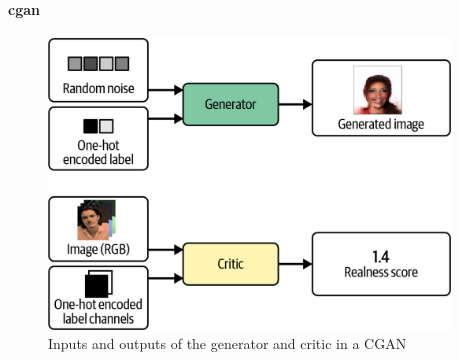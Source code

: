 \paragraph{\gls{cgan}}

\begin{figure}
	\begin{center}
		\includegraphics[width=0.95\textwidth]{figures/cgan}
	\end{center}
	\caption{Inputs and outputs of the generator and critic in a CGAN}\label{fig:cgan}
\end{figure}
